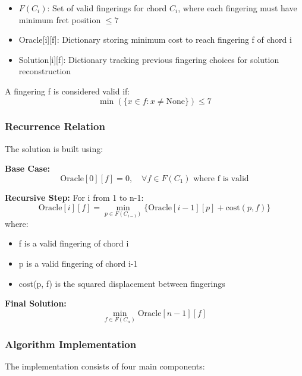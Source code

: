 \documentclass[conference]{IEEEtran}
\begin{document}
\begin{itemize}
    \item \(F(C_i)\): Set of valid fingerings for chord \(C_i\), where each fingering must have minimum fret position \(\leq 7\)
    \item Oracle[i][f]: Dictionary storing minimum cost to reach fingering f of chord i
    \item Solution[i][f]: Dictionary tracking previous fingering choices for solution reconstruction
\end{itemize}

A fingering f is considered valid if:
\[ \min(\{x \in f : x \neq \text{None}\}) \leq 7 \]

\subsubsection{Recurrence Relation}
The solution is built using:

\textbf{Base Case:}
\[ \text{Oracle}[0][f] = 0, \quad \forall f \in F(C_1) \text{ where f is valid} \]

\textbf{Recursive Step:}
For i from 1 to n-1:
\[ \text{Oracle}[i][f] = \min_{p \in F(C_{i-1})} \{\text{Oracle}[i-1][p] + \text{cost}(p, f)\} \]
where:
\begin{itemize}
    \item f is a valid fingering of chord i
    \item p is a valid fingering of chord i-1
    \item cost(p, f) is the squared displacement between fingerings
\end{itemize}

\textbf{Final Solution:}
\[ \min_{f \in F(C_n)} \text{Oracle}[n-1][f] \]

\subsubsection{Algorithm Implementation}
The implementation consists of four main components:
\end{document}
